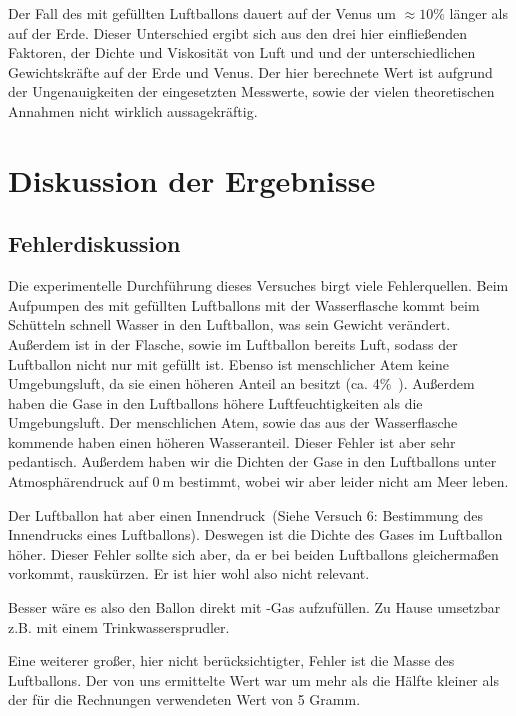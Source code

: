 \documentclass{article}
\begin{document}
          Der Fall des mit  gefüllten Luftballons dauert auf der Venus um \(\approx 10 \% \) länger als auf der Erde.
          Dieser Unterschied ergibt sich aus den drei hier einfließenden Faktoren, der Dichte und Viskosität von Luft und  und der unterschiedlichen Gewichtskräfte auf der Erde und Venus.
          Der hier berechnete Wert ist aufgrund der Ungenauigkeiten der eingesetzten Messwerte, sowie der vielen theoretischen Annahmen nicht wirklich aussagekräftig.

    \section{Diskussion der Ergebnisse}
      \subsection{Fehlerdiskussion}
          Die experimentelle Durchführung dieses Versuches birgt viele Fehlerquellen.
          Beim Aufpumpen des mit  gefüllten Luftballons mit der Wasserflasche kommt beim Schütteln schnell Wasser in den Luftballon,
          was sein Gewicht verändert. Außerdem ist in der Flasche, sowie im Luftballon bereits Luft, sodass der Luftballon nicht nur mit 
          gefüllt ist. Ebenso ist menschlicher Atem keine Umgebungsluft, da sie einen höheren Anteil an  besitzt (ca. 4\%~\cite{Lunge}).
          Außerdem haben die Gase in den Luftballons höhere Luftfeuchtigkeiten als die Umgebungsluft.
          Der menschlichen Atem, sowie das aus der Wasserflasche kommende  haben einen höheren Wasseranteil.
          Dieser Fehler ist aber sehr pedantisch.
          Außerdem haben wir die Dichten der Gase in den Luftballons unter Atmosphärendruck auf \(\SI{0}{\metre}\) bestimmt,
          wobei wir aber leider nicht am Meer leben.

          Der Luftballon hat aber einen Innendruck~(Siehe Versuch 6: Bestimmung des Innendrucks eines Luftballons).
          Deswegen ist die Dichte des Gases im Luftballon höher. Dieser Fehler sollte sich aber, da er bei beiden Luftballons
          gleichermaßen vorkommt, rauskürzen. Er ist hier wohl also nicht relevant.

          Besser wäre es also den Ballon direkt mit -Gas aufzufüllen.
          Zu Hause umsetzbar z.B. mit einem Trinkwassersprudler.

          Eine weiterer großer, hier nicht berücksichtigter, Fehler ist die Masse des Luftballons.
          Der von uns ermittelte Wert war um mehr als die Hälfte kleiner als der für die Rechnungen verwendeten Wert von 5 Gramm.
\end{document}
